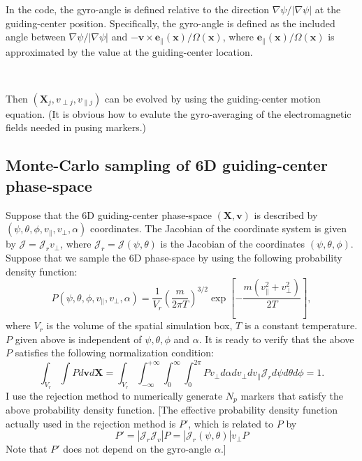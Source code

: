\documentclass{article}
\begin{document}
In the code, the gyro-angle is defined relative to the direction $\nabla \psi
/ | \nabla \psi |$ at the guiding-center position. Specifically, the
gyro-angle is defined as the included angle between $\nabla \psi / | \nabla
\psi |$ and $-\mathbf{v} \times \mathbf{e}_{\parallel} (\mathbf{x}) / \Omega
(\mathbf{x})$, where $\mathbf{e}_{\parallel} (\mathbf{x}) / \Omega
(\mathbf{x})$ is approximated by the value at the guiding-center location.

\

Then $(\mathbf{X}_j, v_{\perp j}, v_{\parallel j})$ can be evolved by using
the guiding-center motion equation. (It is obvious how to evalute the
gyro-averaging of the electromagnetic fields needed in pusing markers.)

\subsection{Monte-Carlo sampling of 6D guiding-center phase-space
}\label{19-1-28-1}

Suppose that the 6D guiding-center phase-space $(\mathbf{X}, \mathbf{v})$ is
described by $(\psi, \theta, \phi, v_{\parallel}, v_{\perp}, \alpha)$
coordinates. The Jacobian of the coordinate system is given by $\mathcal{J} =
\mathcal{J}_r v_{\perp} \mathcal{}$, where $\mathcal{J}_r = \mathcal{J} (\psi,
\theta)$ is the Jacobian of the coordinates $(\psi, \theta, \phi)$. Suppose
that we sample the 6D phase-space by using the following probability density
function:
\begin{equation}
  \label{19-1-26-1} P (\psi, \theta, \phi, v_{\parallel}, v_{\perp}, \alpha) =
  \frac{1}{V_r} \left( \frac{m}{2 \pi T} \right)^{3 / 2} \exp \left[ - \frac{m
  (v_{\parallel}^2 + v_{\perp}^2)}{2 T} \right],
\end{equation}
where $V_r$ is the volume of the spatial simulation box, $T$ is a constant
temperature. $P$ given above is independent of $\psi, \theta, \phi$ and
$\alpha$. It is ready to verify that the above $P$ satisfies the following
normalization condition:
\begin{equation}
  \int_{V_r} \int P d\mathbf{v}d\mathbf{X}= \int_{V_r} \int_{- \infty}^{+
  \infty} \int_0^{\infty} \int_0^{2 \pi} P v_{\perp} d \alpha d v_{\perp} d
  v_{\parallel} \mathcal{J}_r d \psi d \theta d \phi = 1.
\end{equation}
I use the rejection method to numerically generate $N_p$ markers that satisfy
the above probability density function. [The effective probability density
function actually used in the rejection method is $P'$, which is related to
$P$ by
\begin{equation}
  P' = | \mathcal{J}_r \mathcal{J}_v | P = | \mathcal{J}_r (\psi, \theta) |
  v_{\perp} P
\end{equation}
Note that $P'$ does not depend on the gyro-angle $\alpha$.]
\end{document}
